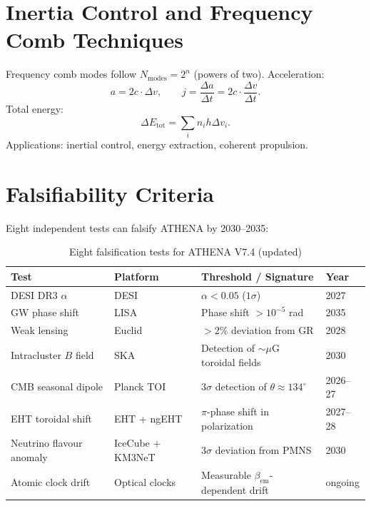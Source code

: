\documentclass[12pt, a4paper]{article}
\begin{document}
\section{Inertia Control and Frequency Comb Techniques}
\label{sec:inertia}
Frequency comb modes follow $N_{\mathrm{modes}} = 2^n$ (powers of two). Acceleration:
\begin{equation}
a = 2c \cdot \Delta v, \qquad j = \frac{\Delta a}{\Delta t} = 2c \cdot \frac{\Delta v}{\Delta t}.
\label{eq:acceleration}
\end{equation}
Total energy:
\begin{equation}
\Delta E_{\mathrm{tot}} = \sum_i n_i h \Delta v_i.
\label{eq:energy_comb}
\end{equation}
Applications: inertial control, energy extraction, coherent propulsion.

\section{Falsifiability Criteria}
\label{sec:falsify}
Eight independent tests can falsify ATHENA by 2030--2035:
\begin{table}[htbp]
\centering
\caption{Eight falsification tests for ATHENA V7.4 (updated)}
\label{tab:falsify}
\begin{tabular}{llll}
\toprule
\textbf{Test} & \textbf{Platform} & \textbf{Threshold / Signature} & \textbf{Year} \\
\midrule
DESI DR3 $\alpha$ & DESI & $\alpha < 0.05$ ($1\sigma$) & 2027 \\
GW phase shift & LISA & Phase shift $> 10^{-5}$ rad & 2035 \\
Weak lensing & Euclid & $> 2\%$ deviation from GR & 2028 \\
Intracluster $B$ field & SKA & Detection of $\sim \mu$G toroidal fields & 2030 \\
CMB seasonal dipole & Planck TOI & $3\sigma$ detection of $\theta \approx 134^\circ$ & 2026--27 \\
EHT toroidal shift & EHT + ngEHT & $\pi$-phase shift in polarization & 2027--28 \\
Neutrino flavour anomaly & IceCube + KM3NeT & $3\sigma$ deviation from PMNS & 2030 \\
Atomic clock drift & Optical clocks & Measurable $\beta_{\mathrm{em}}$-dependent drift & ongoing \\
\bottomrule
\end{tabular}
\end{table}
\end{document}
